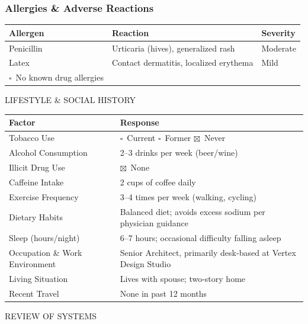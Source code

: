 \documentclass[11pt,letterpaper]{article}
\newcommand{\cb}{$\square$}
\newcommand{\cbx}{$\boxtimes$}
\begin{document}
\vspace{6pt}

\subsubsection*{Allergies \& Adverse Reactions}
\begin{tabularx}{\textwidth}{L{2.0in}L{2.2in}L{2.2in}}
\toprule
{}
\textbf{Allergen} & \textbf{Reaction} & \textbf{Severity} \\
\midrule
Penicillin & Urticaria (hives), generalized rash & Moderate\\
Latex & Contact dermatitis, localized erythema & Mild\\
\cb\ No known drug allergies & & \\
\bottomrule
\end{tabularx}

\newpage

\begin{secbox}
LIFESTYLE \& SOCIAL HISTORY
\end{secbox}

\begin{tabularx}{\textwidth}{L{2.5in}X}
\toprule
{}
\textbf{Factor} & \textbf{Response} \\
\midrule
Tobacco Use & \cb\ Current \quad \cb\ Former \quad \cbx\ Never\\
Alcohol Consumption & 2--3 drinks per week (beer/wine)\\
Illicit Drug Use & \cbx\ None\\
Caffeine Intake & 2 cups of coffee daily\\
Exercise Frequency & 3--4 times per week (walking, cycling)\\
Dietary Habits & Balanced diet; avoids excess sodium per physician guidance\\
Sleep (hours/night) & 6--7 hours; occasional difficulty falling asleep\\
Occupation \& Work Environment & Senior Architect, primarily desk-based at Vertex Design Studio\\
Living Situation & Lives with spouse; two-story home\\
Recent Travel & None in past 12 months\\
\bottomrule
\end{tabularx}

\begin{secbox}
REVIEW OF SYSTEMS
\end{secbox}
\end{document}
